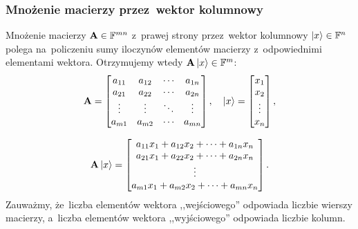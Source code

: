 \subsubsection{Mnożenie macierzy przez~wektor kolumnowy}
Mnożenie macierzy $\mathbf{A}\in \mathbb{F}^{mn}$ z~prawej strony przez~wektor
kolumnowy $\ket{x}\in \mathbb{F}^{n}$ polega na~policzeniu sumy iloczynów elementów
macierzy z~odpowiednimi elementami wektora. Otrzymujemy wtedy $\mathbf{A}\ket{x}\in
	\mathbb{F}^m$:
$$
	\mathbf{A} =
	\begin{bmatrix}
		a_{11} & a_{12} & \cdots & a_{1n} \\
		a_{21} & a_{22} & \cdots & a_{2n} \\
		\vdots & \vdots & \ddots & \vdots \\
		a_{m1} & a_{m2} & \cdots & a_{mn}
	\end{bmatrix}, \quad
	\ket{x}=
	\begin{bmatrix}
		x_1    \\
		x_2    \\
		\vdots \\
		x_{n}  \\
	\end{bmatrix},
$$

$$
	\mathbf{A} \ket{x}=
	\begin{bmatrix}
		a_{11}x_1 + a_{12}x_2 + \dots + a_{1n}x_n \\
		a_{21}x_1 + a_{22}x_2 + \dots + a_{2n}x_n \\
		\vdots                                    \\
		a_{m1}x_1 + a_{m2}x_2 + \cdots + a_{mn}x_n
	\end{bmatrix}.
$$
Zauważmy, że~liczba elementów wektora ,,wejściowego'' odpowiada liczbie wierszy
macierzy, a~liczba elementów wektora ,,wyjściowego'' odpowiada liczbie kolumn.

